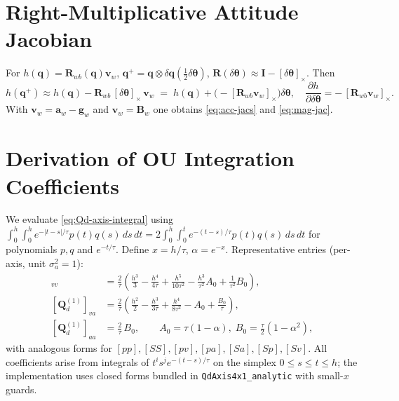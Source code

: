 \documentclass[11pt]{article}
\newcommand{\vect}[1]{\bm{#1}}
\newcommand{\mat}[1]{\bm{#1}}
\newcommand{\quat}[1]{\mathbf{#1}}
\newcommand{\I}{\mat{I}}
\newcommand{\skx}[1]{\left[ #1 \right]_\times}
\begin{document}
\section{Right-Multiplicative Attitude Jacobian}
\label{app:att-jac}
For \(h(\quat{q})=\mat{R}_{wb}(\quat{q})\vect{v}_w\),
\( \quat{q}^+=\quat{q}\otimes \delta\quat{q}(\tfrac12\delta\vect{\theta}) \),
\( \mat{R}(\delta\vect{\theta})\approx \I - \skx{\delta\vect{\theta}} \).
Then
\begin{equation}
  h(\quat{q}^+) \approx h(\quat{q}) - \mat{R}_{wb}\,\skx{\delta\vect{\theta}}\,\vect{v}_w
  \;=\; h(\quat{q}) + \bigl(-\skx{\mat{R}_{wb}\vect{v}_w}\bigr)\delta\vect{\theta},
  \quad
  \frac{\partial h}{\partial \delta\vect{\theta}} = -\,\skx{\mat{R}_{wb}\vect{v}_w}.
  \label{eq:att-jac-appendix}
\end{equation}
With \(\vect{v}_w = \vect{a}_w-\vect{g}_w\) and \(\vect{v}_w=\vect{B}_w\) one obtains
\eqref{eq:acc-jacs} and \eqref{eq:mag-jac}.

\section{Derivation of OU Integration Coefficients}
\label{app:ou-kernel}
We evaluate \eqref{eq:Qd-axis-integral} using
\(
\int_0^h\!\!\int_0^h e^{-|t-s|/\tau} p(t) q(s)\,ds\,dt
= 2\int_0^h \int_0^t e^{-(t-s)/\tau} p(t) q(s)\,ds\,dt
\)
for polynomials \(p,q\) and \(e^{-t/\tau}\).
Define \(x=h/\tau\), \(\alpha=e^{-x}\).
Representative entries (per-axis, unit \(\sigma_a^2=1\)):
\begin{align}
  [\mat{Q}_d^{(1)}]_{vv} &= \tfrac{2}{\tau}\!\left(
     \tfrac{h^3}{3} - \tfrac{h^4}{4\tau} + \tfrac{h^5}{10\tau^2}
     - \tfrac{h^3}{\tau^2}A_0 + \tfrac{1}{\tau^2}B_0
  \right), \label{eq:Qvv}\\
  [\mat{Q}_d^{(1)}]_{va} &= \tfrac{2}{\tau}\!\left(
     \tfrac{h^2}{2} - \tfrac{h^3}{3\tau} + \tfrac{h^4}{8\tau^2}
     - A_0 + \tfrac{B_0}{\tau}
  \right), \label{eq:Qva}\\
  [\mat{Q}_d^{(1)}]_{aa} &= \tfrac{2}{\tau}\, B_0,
  \qquad
  A_0=\tau(1-\alpha),\; B_0=\tfrac{\tau}{2}(1-\alpha^2),
  \label{eq:Qaa}
\end{align}
with analogous forms for \([pp], [SS], [pv], [pa], [Sa], [Sp], [Sv]\).
All coefficients arise from integrals of \(t^i s^j e^{-(t-s)/\tau}\) on the
simplex \(0\le s\le t\le h\); the implementation uses closed forms bundled
in \texttt{QdAxis4x1\_analytic} with small-\(x\) guards.
\end{document}

